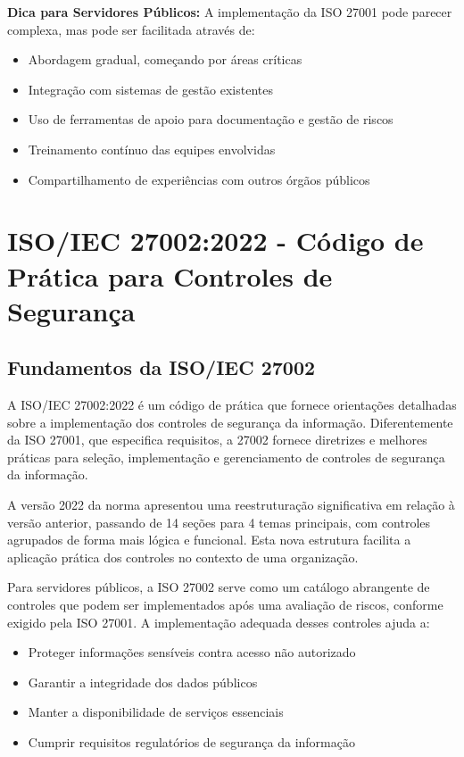 \documentclass[12pt,a4paper]{report}
\begin{document}
\begin{notebox}
\textbf{Dica para Servidores Públicos:} A implementação da ISO 27001 pode parecer complexa, mas pode ser facilitada através de:

\begin{itemize}
  \item Abordagem gradual, começando por áreas críticas
  \item Integração com sistemas de gestão existentes
  \item Uso de ferramentas de apoio para documentação e gestão de riscos
  \item Treinamento contínuo das equipes envolvidas
  \item Compartilhamento de experiências com outros órgãos públicos
\end{itemize}
\end{notebox}

\chapter{ISO/IEC 27002:2022 - Código de Prática para Controles de Segurança}

\section{Fundamentos da ISO/IEC 27002}

A ISO/IEC 27002:2022 é um código de prática que fornece orientações detalhadas sobre a implementação dos controles de segurança da informação. Diferentemente da ISO 27001, que especifica requisitos, a 27002 fornece diretrizes e melhores práticas para seleção, implementação e gerenciamento de controles de segurança da informação.

A versão 2022 da norma apresentou uma reestruturação significativa em relação à versão anterior, passando de 14 seções para 4 temas principais, com controles agrupados de forma mais lógica e funcional. Esta nova estrutura facilita a aplicação prática dos controles no contexto de uma organização.

Para servidores públicos, a ISO 27002 serve como um catálogo abrangente de controles que podem ser implementados após uma avaliação de riscos, conforme exigido pela ISO 27001. A implementação adequada desses controles ajuda a:

\begin{itemize}
  \item Proteger informações sensíveis contra acesso não autorizado
  \item Garantir a integridade dos dados públicos
  \item Manter a disponibilidade de serviços essenciais
  \item Cumprir requisitos regulatórios de segurança da informação
\end{itemize}
\end{document}
